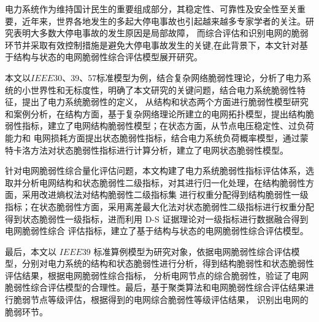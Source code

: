 \begin{cabstract}
  电力系统作为维持国计民生的重要组成部分，其稳定性、可靠性及安全性至关重要，近年来，世界各地发生的多起大停电事故也引起越来越多专家学者的关注。研究表明大多数大停电事故的发生原因是局部故障，
  而综合评估和识别电网的脆弱环节并采取有效控制措施是避免大停电事故发生的关键,在此背景下，本文针对基于结构与状态的电网脆弱性综合评估模型展开研究。
  
  
  本文以$IEEE$30、39、57标准模型为例，结合复杂网络脆弱性理论，分析了电力系统的小世界性和无标度性，明确了本文研究的关键问题，结合电力系统脆弱性特征，提出了电力系统脆弱性的定义，
  从结构和状态两个方面进行脆弱性模型研究和案例分析，在结构方面，基于复杂网络理论所建立的电网拓扑模型，提出结构脆弱性指标，建立了电网结构脆弱性模型；在状态方面，从节点电压稳定性、过负荷能力和
  电网损耗方面提出状态脆弱性指标，结合电力系统负荷概率模型，通过蒙特卡洛方法对状态脆弱性指标进行计算分析，建立了电网状态脆弱性模型。
  
  针对电网脆弱性综合量化评估问题，本文构建了电力系统脆弱性指标评估体系，选取并分析电网结构和状态脆弱性二级指标，对其进行归一化处理，在结构脆弱性方面，采用改进熵权法对结构脆弱性二级指标集
  进行权重分配得到结构脆弱性一级指标；在状态脆弱性方面，采用离差最大化法对状态脆弱性二级指标进行权重分配得到状态脆弱性一级指标，进而利用 D-S 证据理论对一级指标进行数据融合得到电网脆弱性综合
  评估指标，建立了基于结构与状态的电网脆弱性综合评估模型。
  
  最后，本文以 $IEEE39$ 标准算例模型为研究对象，依据电网脆弱性综合评估模型，分别对电力系统的结构和状态脆弱性进行分析，得到结构脆弱性和状态脆弱性评估结果，根据电网脆弱性综合指标，
  分析电网节点的综合脆弱性，验证了电网脆弱性综合评估模型的合理性。最后，基于聚类算法和电网脆弱性综合评估结果进行脆弱节点等级评估，根据得到的电网综合脆弱性等级评估结果，
  识别出电网的脆弱环节。




\end{cabstract}
